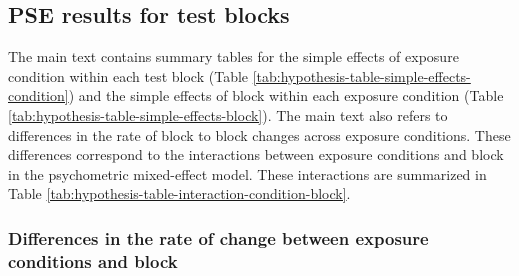 \documentclass[
  11pt,
  man,mask,floatsintext]{apa6}
\begin{document}
\subsection{PSE results for test blocks}\label{pse-results-for-test-blocks}

The main text contains summary tables for the simple effects of exposure condition within each test block (Table \ref{tab:hypothesis-table-simple-effects-condition}) and the simple effects of block within each exposure condition (Table \ref{tab:hypothesis-table-simple-effects-block}). The main text also refers to differences in the rate of block to block changes across exposure conditions. These differences correspond to the interactions between exposure conditions and block in the psychometric mixed-effect model. These interactions are summarized in Table \ref{tab:hypothesis-table-interaction-condition-block}.

\subsubsection{Differences in the rate of change between exposure conditions and block}\label{differences-in-the-rate-of-change-between-exposure-conditions-and-block}
\end{document}
